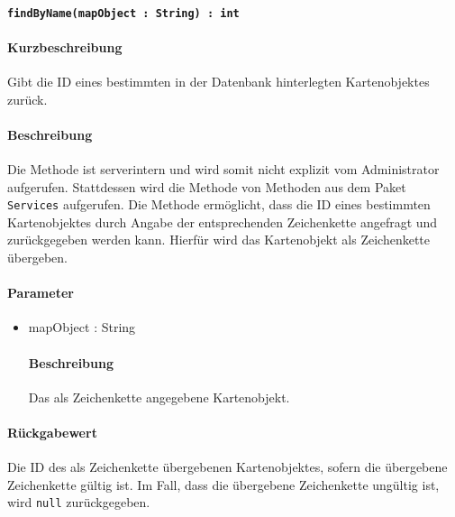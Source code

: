 \paragraph{\texttt{findByName(mapObject : String) : int}}%
\paragraph*{Kurzbeschreibung}
Gibt die ID eines bestimmten in der Datenbank hinterlegten Kartenobjektes zurück.
\paragraph*{Beschreibung}
Die Methode ist serverintern und wird somit nicht explizit vom Administrator aufgerufen.
Stattdessen wird die Methode von Methoden aus dem Paket \texttt{Services} aufgerufen.
Die Methode ermöglicht, dass die ID eines bestimmten Kartenobjektes durch Angabe der entsprechenden Zeichenkette angefragt und zurückgegeben werden kann.
Hierfür wird das Kartenobjekt als Zeichenkette übergeben.
\paragraph*{Parameter}
\begin{itemize}
    \item mapObject : String
    		\paragraph*{Beschreibung}
    		Das als Zeichenkette angegebene Kartenobjekt.
\end{itemize}
\paragraph*{Rückgabewert}
Die ID des als Zeichenkette übergebenen Kartenobjektes, sofern die übergebene Zeichenkette gültig ist.
Im Fall, dass die übergebene Zeichenkette ungültig ist, wird \texttt{null} zurückgegeben.

